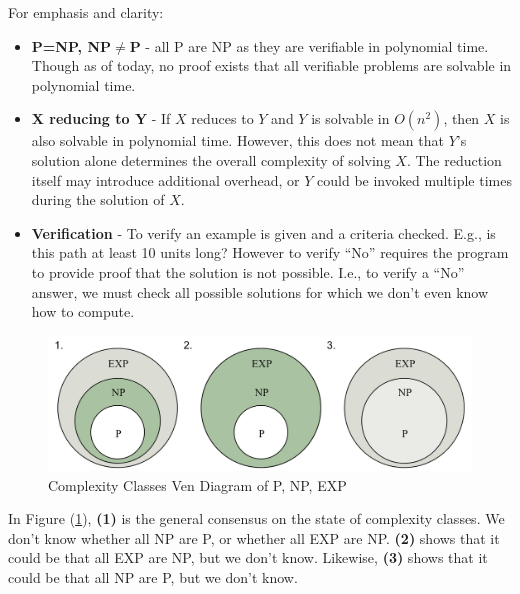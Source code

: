 \noindent
For emphasis and clarity:
\begin{theo}

    \begin{itemize}
        \item \textbf{P=NP, NP$\neq$P} - all P are NP as they are verifiable in polynomial time. Though as of today, no proof exists that all verifiable problems are solvable in polynomial time.

        \item \textbf{X reducing to Y} - If $X$ reduces to $Y$ and $Y$ is solvable in $O(n^2)$, then $X$ is also solvable in polynomial time. 
        However, this does not mean that $Y$'s solution alone determines the overall complexity of solving $X$. The reduction itself 
        may introduce additional overhead, or $Y$ could be invoked multiple times during the solution of $X$.

        \item \textbf{Verification} - To verify an example is given and a criteria checked. E.g., is this path at least 10 units long?
        However to verify ``No'' requires the program to provide proof that the solution is not possible. I.e., to verify a ``No'' answer, we must check all possible solutions for which 
        we don't even know how to compute.
    \end{itemize}
\end{theo}

\begin{figure}[h!]
    \centering
    \includegraphics[width=1\textwidth]{Sections/hard/diagrams.png}
    \caption{Complexity Classes Ven Diagram of P, NP, EXP}
    \label{fig:ven}
\end{figure}

In Figure (\ref{fig:ven}), \textbf{(1)} is the general consensus on the state of complexity classes. We don't know whether 
all NP are P, or whether all EXP are NP. \textbf{(2)} shows that it could be that all EXP are NP, but we don't know. Likewise, \textbf{(3)} shows that it could be that all NP are P, but we don't know.

